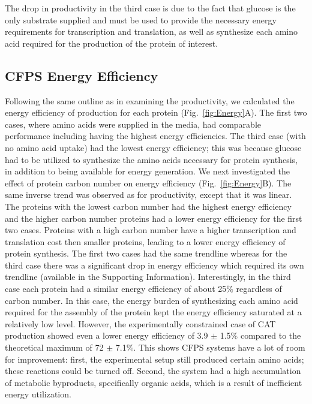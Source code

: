 \documentclass[journal=asbcd6,manuscript=article]{achemso}
\begin{document}
The drop in productivity in the third case is due to the fact that glucose is the only substrate supplied and must be used to provide the necessary energy requirements for transcription and translation, as well as synthesize each amino acid required for the production of the protein of interest.  

\subsection{CFPS Energy Efficiency}
Following the same outline as in examining the productivity, we calculated the energy efficiency of production for each protein (Fig.~\ref{fig:Energy}A).
The first two cases, where amino acids were supplied in the media, had comparable performance including having the highest energy efficiencies.
The third case (with no amino acid uptake) had the lowest energy efficiency; this was because glucose had to be utilized to synthesize the amino acids necessary for protein synthesis, in addition to being available for energy generation.
We next investigated the effect of protein carbon number on energy efficiency (Fig.~\ref{fig:Energy}B).
The same inverse trend was observed as for productivity, except that it was linear.
The proteins with the lowest carbon number had the highest energy efficiency and the higher carbon number proteins had a lower energy efficiency for the first two cases.
Proteins with a high carbon number have a higher transcription and translation cost then smaller proteins, leading to a lower energy efficiency of protein synthesis.  
The first two cases had the same trendline whereas for the third case there was a significant drop in energy efficiency which required its own trendline (available in the Supporting Information).
Interestingly, in the third case each protein had a similar energy efficiency of about 25\% regardless of carbon number.
In this case, the energy burden of synthesizing each amino acid required for the assembly of the protein kept the energy efficiency saturated at a relatively low level.
However, the experimentally constrained case of CAT production showed even a lower energy efficiency of 3.9 $\pm$ 1.5\% compared to the theoretical maximum of 72 $\pm$ 7.1\%.
This shows CFPS systems have a lot of room for improvement: first, the experimental setup still produced certain amino acids; these reactions could be turned off.
Second, the system had a high accumulation of metabolic byproducts, specifically organic acids, which is a result of inefficient energy utilization.
\end{document}
